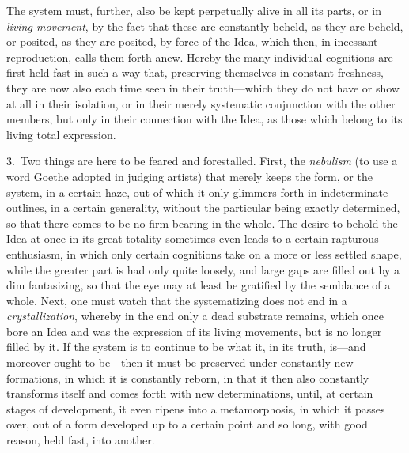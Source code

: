 \documentclass[12pt,a4paper]{book}
\begin{document}
The system must, further, also be kept perpetually alive in all its parts, or in
\emph{living movement}, by the fact that these are constantly beheld, as they are beheld,
or posited, as they are posited, by force of the Idea, which then, in incessant
reproduction, calls them forth anew. Hereby the many individual cognitions are first held
fast in such a way that, preserving themselves in constant freshness, they are now also
each time seen in their truth---which they do not have or show at all in their isolation,
or in their merely systematic conjunction with the other members, but only in their
connection with the Idea, as those which belong to its living total expression.

3.~Two things are here to be feared and forestalled. First, the \emph{nebulism} (to use a
word Goethe adopted in judging artists) that merely keeps the form, or the system, in a
certain haze, out of which it only glimmers forth in indeterminate outlines, in a certain
generality, without the particular being exactly determined, so that there comes to be no
firm bearing in the whole. The desire to behold the Idea at once in its great totality
sometimes even leads to a certain rapturous enthusiasm, in which only certain cognitions
take on a more or less settled shape, while the greater part is had only quite loosely,
and large gaps are filled out by a dim fantasizing, so that the eye may at least be
gratified by the semblance of a whole. Next, one must watch that the systematizing does
not end in a \emph{crystallization}, whereby in the end only a dead substrate remains,
which once bore an Idea and was the expression of its living movements, but is no longer
filled by it. If the system is to continue to be what it, in its truth, is---and moreover
ought to be---then it must be preserved under constantly new formations, in which it is
constantly reborn, in that it then also constantly transforms itself and comes forth with
new determinations, until, at certain stages of development, it even ripens into a
metamorphosis, in which it passes over, out of a form developed up to a certain point and
so long, with good reason, held fast, into another.
\end{document}

